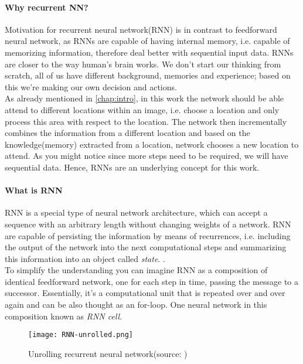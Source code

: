 \paragraph{Why recurrent NN?} Motivation for recurrent neural network(RNN) is
in contrast to feedforward neural network, as RNNs are capable of having internal memory,
i.e. capable of memorizing information, therefore deal better with sequential input data.
RNNs are closer to the way human's brain works. We don't start our thinking from scratch,
all of us have different background, memories and experience; based on this
we're making our own decision and actions. \\
As already mentioned in \autoref{chap:intro}, in this work
the network should be able attend to different locations within an image, i.e.
choose a location and only process this area with respect to the location. The network then
incrementally combines the information from a different location and based
on the knowledge(memory) extracted from a location, network chooses a new location to
attend. As you might notice since more steps need to be required, we will have sequential
data. Hence, RNNs are an underlying concept for this work.

\paragraph{What is RNN} RNN is a special type of neural network architecture, which can
accept a sequence with an arbitrary length without changing weights of a network.
RNN are capable of persisting the information by means of recurrences, i.e. including
the output of the network into the next computational steps and summarizing this information
into an object called \emph{state}.
 \cite{Kriesel2007NeuralNetworks}.
\\
To simplify the understanding you can imagine RNN as a composition of identical
feedforward network, one for each step in time, passing the message to a successor.
Essentially, it's a computational unit that is repeated over and over again and
can be also thought as an for-loop.
One neural network in this composition known as \emph{RNN cell}.

\begin{figure}[H]
	\texttt{[image: RNN-unrolled.png]}
	\caption{Unrolling recurrent neural network(source: \cite{ColahChristopher2015})}
	\label{img:rnn_unrolled}
\end{figure}

